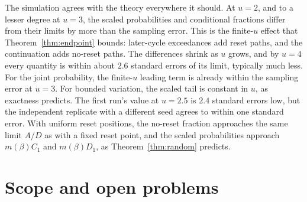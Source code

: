 \documentclass[11pt,a4paper]{article}
\begin{document}
The simulation agrees with the theory everywhere it should. At $u=2$, and to a lesser degree at $u=3$, the scaled probabilities and conditional fractions differ from their limits by more than the sampling error. This is the finite-$u$ effect that Theorem~\ref{thm:endpoint} bounds: later-cycle exceedances add reset paths, and the continuation adds no-reset paths. The differences shrink as $u$ grows, and by $u=4$ every quantity is within about $2.6$ standard errors of its limit, typically much less. For the joint probability, the finite-$u$ leading term is already within the sampling error at $u=3$. For bounded variation, the scaled tail is constant in $u$, as exactness predicts. The first run's value at $u=2.5$ is $2.4$ standard errors low, but the independent replicate with a different seed agrees to within one standard error. With uniform reset positions, the no-reset fraction approaches the same limit $A/D$ as with a fixed reset point, and the scaled probabilities approach $m(\beta)C_1$ and $m(\beta)D_1$, as Theorem~\ref{thm:random} predicts.


\section{Scope and open problems}\label{sec:scope}
\end{document}
